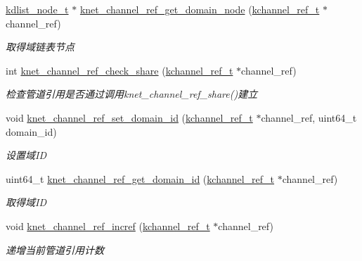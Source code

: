 \begin{DoxyCompactItemize}
\hyperlink{a00051_ac701f00a0851c97467ae35c382b316b7_ac701f00a0851c97467ae35c382b316b7}{kdlist\+\_\+node\+\_\+t} $\ast$ \hyperlink{a00049_a73d7e2605300866e15b64bc0aa70f16d_a73d7e2605300866e15b64bc0aa70f16d}{knet\+\_\+channel\+\_\+ref\+\_\+get\+\_\+domain\+\_\+node} (\hyperlink{a00051_a3b7e82599367eade261456f60ebe2cd9_a3b7e82599367eade261456f60ebe2cd9}{kchannel\+\_\+ref\+\_\+t} $\ast$channel\+\_\+ref)
\begin{DoxyCompactList}\small\item\em 取得域链表节点 \end{DoxyCompactList}\item 
int \hyperlink{a00049_a320eba2d439fc73634d1da04d1aa331e_a320eba2d439fc73634d1da04d1aa331e}{knet\+\_\+channel\+\_\+ref\+\_\+check\+\_\+share} (\hyperlink{a00051_a3b7e82599367eade261456f60ebe2cd9_a3b7e82599367eade261456f60ebe2cd9}{kchannel\+\_\+ref\+\_\+t} $\ast$channel\+\_\+ref)
\begin{DoxyCompactList}\small\item\em 检查管道引用是否通过调用knet\+\_\+channel\+\_\+ref\+\_\+share()建立 \end{DoxyCompactList}\item 
void \hyperlink{a00049_ab95b2c215da829c9f6cec2d7519bb79e_ab95b2c215da829c9f6cec2d7519bb79e}{knet\+\_\+channel\+\_\+ref\+\_\+set\+\_\+domain\+\_\+id} (\hyperlink{a00051_a3b7e82599367eade261456f60ebe2cd9_a3b7e82599367eade261456f60ebe2cd9}{kchannel\+\_\+ref\+\_\+t} $\ast$channel\+\_\+ref, uint64\+\_\+t domain\+\_\+id)
\begin{DoxyCompactList}\small\item\em 设置域\+I\+D \end{DoxyCompactList}\item 
uint64\+\_\+t \hyperlink{a00049_a1c889495cfd41279b4f9322f5361161f_a1c889495cfd41279b4f9322f5361161f}{knet\+\_\+channel\+\_\+ref\+\_\+get\+\_\+domain\+\_\+id} (\hyperlink{a00051_a3b7e82599367eade261456f60ebe2cd9_a3b7e82599367eade261456f60ebe2cd9}{kchannel\+\_\+ref\+\_\+t} $\ast$channel\+\_\+ref)
\begin{DoxyCompactList}\small\item\em 取得域\+I\+D \end{DoxyCompactList}\item 
void \hyperlink{a00049_aa2180d5a8bdc915fd31983a3b5b17322_aa2180d5a8bdc915fd31983a3b5b17322}{knet\+\_\+channel\+\_\+ref\+\_\+incref} (\hyperlink{a00051_a3b7e82599367eade261456f60ebe2cd9_a3b7e82599367eade261456f60ebe2cd9}{kchannel\+\_\+ref\+\_\+t} $\ast$channel\+\_\+ref)
\begin{DoxyCompactList}\small\item\em 递增当前管道引用计数 \end{DoxyCompactList}\item 

\end{DoxyCompactItemize}
